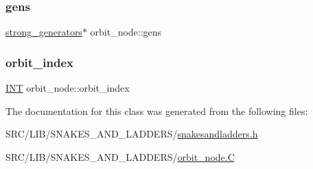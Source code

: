 \mbox{\label{classorbit__node_a8c7e073aa3d5cf44690dd518b0f9414d}} 
\subsubsection{\texorpdfstring{gens}{gens}}
{\footnotesize\ttfamily \mbox{\hyperlink{classstrong__generators}{strong\+\_\+generators}}$\ast$ orbit\+\_\+node\+::gens}

\mbox{\label{classorbit__node_a4565d1b24e3cf2c0edb83c9d6e992ba9}} 
\subsubsection{\texorpdfstring{orbit\+\_\+index}{orbit\_index}}
{\footnotesize\ttfamily \mbox{\hyperlink{galois_8h_a09fddde158a3a20bd2dcadb609de11dc}{I\+NT}} orbit\+\_\+node\+::orbit\+\_\+index}



The documentation for this class was generated from the following files\+:\begin{DoxyCompactItemize}
\item 
S\+R\+C/\+L\+I\+B/\+S\+N\+A\+K\+E\+S\+\_\+\+A\+N\+D\+\_\+\+L\+A\+D\+D\+E\+R\+S/\mbox{\hyperlink{snakesandladders_8h}{snakesandladders.\+h}}\item 
S\+R\+C/\+L\+I\+B/\+S\+N\+A\+K\+E\+S\+\_\+\+A\+N\+D\+\_\+\+L\+A\+D\+D\+E\+R\+S/\mbox{\hyperlink{orbit__node_8_c}{orbit\+\_\+node.\+C}}\end{DoxyCompactItemize}
